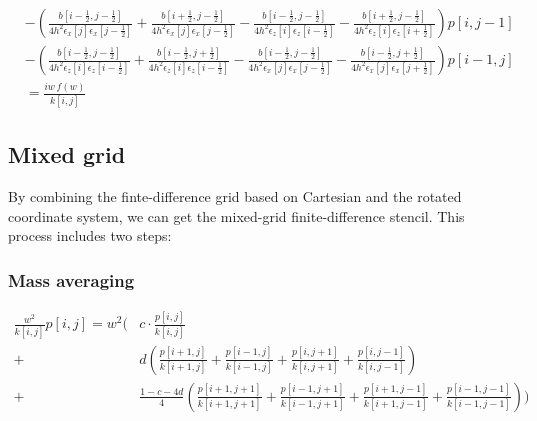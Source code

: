 \documentclass[revised,endfloat]{geophysics}
\begin{document}
\begin{equation}
\begin{split}
                          &-(\frac{b[i-\frac{1}{2}, j-\frac{1}{2}]}{4h^2 \epsilon_x[j] \epsilon_x[j-\frac{1}{2}]} + \frac{b[i+\frac{1}{2}, j-\frac{1}{2}]}{4h^2 \epsilon_x[j] \epsilon_x[j-\frac{1}{2}]} - \frac{b[i-\frac{1}{2}, j-\frac{1}{2}]}{4h^2 \epsilon_z[i] \epsilon_z[i-\frac{1}{2}]} - \frac{b[i+\frac{1}{2}, j-\frac{1}{2}]}{4h^2 \epsilon_z[i] \epsilon_z[i+\frac{1}{2}]} )p[i,j-1] \\
                          &-(\frac{b[i-\frac{1}{2}, j-\frac{1}{2}]}{4h^2 \epsilon_z[i] \epsilon_z[i-\frac{1}{2}]} + \frac{b[i-\frac{1}{2}, j+\frac{1}{2}]}{4h^2 \epsilon_z[i] \epsilon_z[i-\frac{1}{2}]} - \frac{b[i-\frac{1}{2}, j-\frac{1}{2}]}{4h^2 \epsilon_x[j] \epsilon_x[j-\frac{1}{2}]} - \frac{b[i-\frac{1}{2}, j+\frac{1}{2}]}{4h^2 \epsilon_x[j] \epsilon_x[j+\frac{1}{2}]} )p[i-1,j] \\
                          &= \frac{iw\,f(w)}{k[i,j]}
\end{split} 
\label{eq111}
\end{equation}

\subsection{Mixed grid}
By combining the finte-difference grid based on Cartesian and the rotated coordinate system, we can get the mixed-grid finite-difference stencil. This process includes two steps:

\subsubsection{Mass averaging}
\begin{equation}
\begin{split}
\frac{w^2}{k[i,j]}p[i,j] = w^2( &c \cdot \frac{p[i,j]}{k[i,j]} \\ 
+ &d (\frac{p[i+1,j]}{k[i+1,j]}+\frac{p[i-1,j]}{k[i-1,j]}+\frac{p[i,j+1]}{k[i,j+1]}+\frac{p[i,j-1]}{k[i,j-1]}) \\
+ & \frac{1-c-4d}{4} (\frac{p[i+1,j+1]}{k[i+1,j+1]}+\frac{p[i-1,j+1]}{k[i-1,j+1]}+\frac{p[i+1,j-1]}{k[i+1,j-1]}+ \frac{p[i-1,j-1]}{k[i-1,j-1]}) ) \\ 
\end{split}
\label{eq112}
\end{equation}
\end{document}
